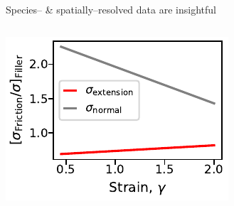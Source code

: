 \documentclass[aspectratio=169,xcolor=table]{beamer}
\begin{document}
\begin{frame}{Species-- \& spatially--resolved data are insightful}
\begin{columns}[T]
  \includegraphics[]{../figures/fig-pratios_between/fig-pratios_between.ratio.pdf}

  \end{columns}
\end{frame}
\end{document}
